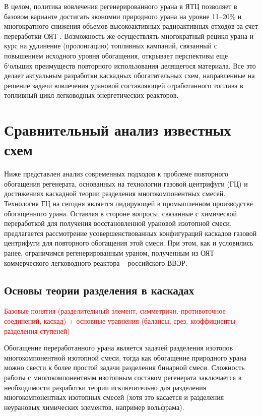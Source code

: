 В целом, политика вовлечения регенерированного урана в ЯТЦ позволяет в базовом варианте достигать экономии природного урана на уровне 11--20\% и многократного снижения объемов высокоактивных радиоактивных отходов за счет переработки ОЯТ \cite{delculAnalysisReuseUranium2009}. Возможность же осуществлять многократный рецикл урана и курс на удлинение (пролонгацию) топливных кампаний, связанный с повышением исходного уровня обогащения, открывает перспективы еще б`ольших преимуществ повторного использования делящегося материала.
Все это делает актуальным разработки каскадных обогатительных схем, направленные на решение задачи вовлечения урановой составляющей отработанного топлива в топливный цикл легководных энергетических реакторов.


\section{Сравнительный анализ известных схем}\label{sec:ch1/sec2}

Ниже представлен анализ современных подходов к проблеме повторного обогащения регенерата, основанных на технологии газовой центрифуги (ГЦ) и достижениях каскадной теории разделения многокомпонентных смесей. Технология ГЦ на сегодня является лидирующей в промышленном производстве обогащенного урана.
Оставляя в стороне вопросы, связанные с химической переработкой для получения восстановленной урановой изотопной смеси, предлагается рассмотрение усовершенствованных конфигураций каскадов газовой центрифуги для повторного обогащения этой смеси. При этом, как и условились ранее, ограничимся регенерированным ураном, полученным из ОЯТ коммерческого легководного реактора -- российского ВВЭР.

\subsection{Основы теории разделения в каскадах}\label{sec:ch1/sec2.1}

\textcolor{red}{Базовые понятия (разделительный элемент, симметричн.-противоточное соединений, каскад) + основные уравнения (балансы, срез, коэффициенты разделения ступеней)}

Обогащение переработанного урана является задачей разделения изотопов многокомпонентной изотопной смеси, тогда как обогащение природного урана можно свести к более простой задачи разделения бинарной смеси. Сложность работы с многокомпонентным изотопным составом регенерата заключается в необходимости разработки теории исключительно для разделения многокомпонентных изотопных смесей (хотя это касается и разделения неурановых химических элементов, например вольфрама).

